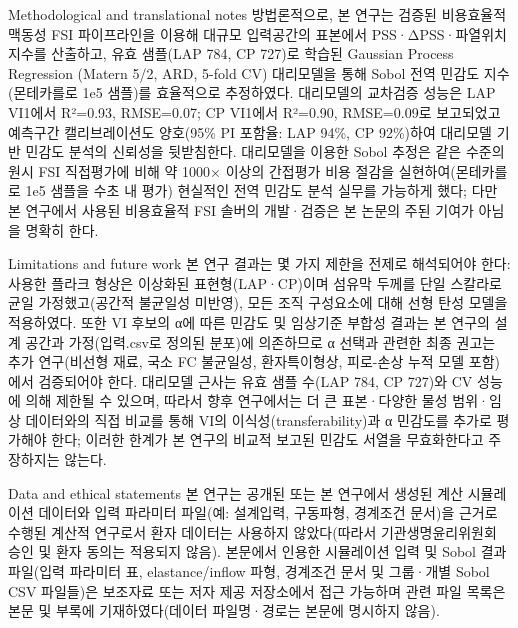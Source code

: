 \documentclass[preprint,12pt]{elsarticle}
\begin{document}
Methodological and translational notes
방법론적으로, 본 연구는 검증된 비용효율적 맥동성 FSI 파이프라인을 이용해 대규모 입력공간의 표본에서 PSS·ΔPSS·파열위치 지수를 산출하고, 유효 샘플(LAP 784, CP 727)로 학습된 Gaussian Process Regression (Matern 5/2, ARD, 5-fold CV) 대리모델을 통해 Sobol 전역 민감도 지수(몬테카를로 1e5 샘플)를 효율적으로 추정하였다. 대리모델의 교차검증 성능은 LAP VI1에서 R²=0.93, RMSE=0.07; CP VI1에서 R²=0.90, RMSE=0.09로 보고되었고 예측구간 캘리브레이션도 양호(95\% PI 포함율: LAP 94\%, CP 92\%)하여 대리모델 기반 민감도 분석의 신뢰성을 뒷받침한다. 대리모델을 이용한 Sobol 추정은 같은 수준의 원시 FSI 직접평가에 비해 약 1000× 이상의 간접평가 비용 절감을 실현하여(몬테카를로 1e5 샘플을 수초 내 평가) 현실적인 전역 민감도 분석 실무를 가능하게 했다; 다만 본 연구에서 사용된 비용효율적 FSI 솔버의 개발·검증은 본 논문의 주된 기여가 아님을 명확히 한다.

Limitations and future work
본 연구 결과는 몇 가지 제한을 전제로 해석되어야 한다: 사용한 플라크 형상은 이상화된 표현형(LAP·CP)이며 섬유막 두께를 단일 스칼라로 균일 가정했고(공간적 불균일성 미반영), 모든 조직 구성요소에 대해 선형 탄성 모델을 적용하였다. 또한 VI 후보의 α에 따른 민감도 및 임상기준 부합성 결과는 본 연구의 설계 공간과 가정(입력.csv로 정의된 분포)에 의존하므로 α 선택과 관련한 최종 권고는 추가 연구(비선형 재료, 국소 FC 불균일성, 환자특이형상, 피로-손상 누적 모델 포함)에서 검증되어야 한다. 대리모델 근사는 유효 샘플 수(LAP 784, CP 727)와 CV 성능에 의해 제한될 수 있으며, 따라서 향후 연구에서는 더 큰 표본·다양한 물성 범위·임상 데이터와의 직접 비교를 통해 VI의 이식성(transferability)과 α 민감도를 추가로 평가해야 한다; 이러한 한계가 본 연구의 비교적 보고된 민감도 서열을 무효화한다고 주장하지는 않는다.

Data and ethical statements
본 연구는 공개된 또는 본 연구에서 생성된 계산 시뮬레이션 데이터와 입력 파라미터 파일(예: 설계입력, 구동파형, 경계조건 문서)을 근거로 수행된 계산적 연구로서 환자 데이터는 사용하지 않았다(따라서 기관생명윤리위원회 승인 및 환자 동의는 적용되지 않음). 본문에서 인용한 시뮬레이션 입력 및 Sobol 결과 파일(입력 파라미터 표, elastance/inflow 파형, 경계조건 문서 및 그룹·개별 Sobol CSV 파일들)은 보조자료 또는 저자 제공 저장소에서 접근 가능하며 관련 파일 목록은 본문 및 부록에 기재하였다(데이터 파일명·경로는 본문에 명시하지 않음).
\end{document}
